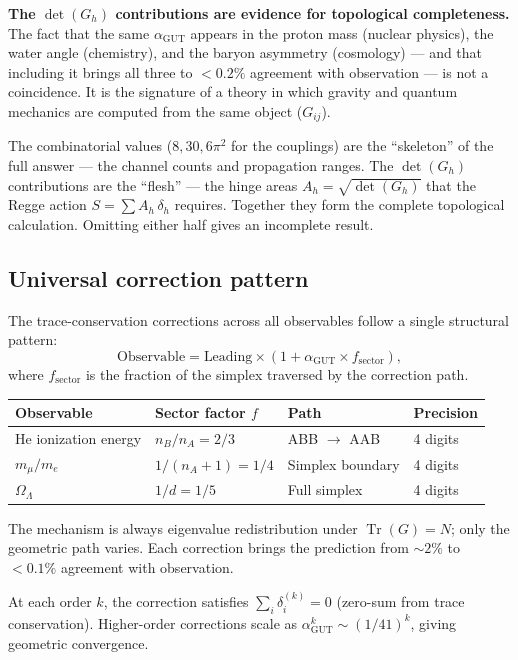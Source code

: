 \textbf{The $\det(G_h)$ contributions are evidence for topological completeness.} The fact that the same $\alpha_\text{GUT}$ appears in the proton mass (nuclear physics), the water angle (chemistry), and the baryon asymmetry (cosmology) --- and that including it brings all three to $< 0.2\%$ agreement with observation --- is not a coincidence. It is the signature of a theory in which gravity and quantum mechanics are computed from the same object ($G_{ij}$).

\begin{remark}
The combinatorial values ($8, 30, 6\pi^2$ for the couplings) are the ``skeleton'' of the full answer --- the channel counts and propagation ranges. The $\det(G_h)$ contributions are the ``flesh'' --- the hinge areas $A_h = \sqrt{\det(G_h)}$ that the Regge action $S = \sum A_h\,\delta_h$ requires. Together they form the complete topological calculation. Omitting either half gives an incomplete result.
\end{remark}

\subsection{Universal correction pattern}
\label{sec:universal_correction}

The trace-conservation corrections across all observables follow a single structural pattern:
\begin{equation}
\boxed{\text{Observable} = \text{Leading} \times \left(1 + \alpha_\mathrm{GUT} \times f_\mathrm{sector}\right),}
\end{equation}
where $f_\mathrm{sector}$ is the fraction of the simplex traversed by the correction path.

\begin{center}
\begin{tabular}{llll}
\toprule
Observable & Sector factor $f$ & Path & Precision \\
\midrule
He ionization energy & $n_B/n_A = 2/3$ & ABB $\to$ AAB & 4 digits \\
$m_\mu/m_e$ & $1/(n_A+1) = 1/4$ & Simplex boundary & 4 digits \\
$\Omega_\Lambda$ & $1/d = 1/5$ & Full simplex & 4 digits \\
\bottomrule
\end{tabular}
\end{center}

The mechanism is always eigenvalue redistribution under $\operatorname{Tr}(G) = N$; only the geometric path varies.  Each correction brings the prediction from $\sim\!2\%$ to $<\!0.1\%$ agreement with observation.

\begin{theorem}[Convergence]
\label{thm:convergence}
At each order $k$, the correction satisfies $\sum_i \delta^{(k)}_i = 0$ (zero-sum from trace conservation).  Higher-order corrections scale as $\alpha_\mathrm{GUT}^k \sim (1/41)^k$, giving geometric convergence.
\end{theorem}
